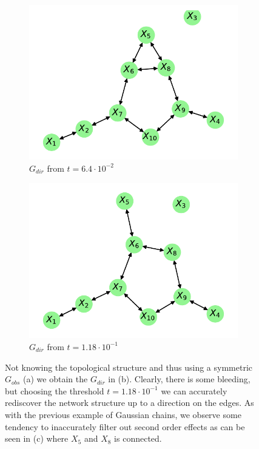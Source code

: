 \documentclass[../Thesis.tex]{subfiles}
\begin{document}
\begin{figure}[H]
\begin{subfigure}[t]{0.49\textwidth}
    \end{subfigure}
    \\[\baselineskip]
    \begin{subfigure}[t]{0.49\textwidth}
        \centering
        \includegraphics[width=.9\linewidth]{figures/Gaussian Network Theoretical/Graph from symmetric G obs - cor - cutoff 6_4e-2.pdf}
        \caption{$G_{dir}$  from $t = 6.4 \cdot 10^{-2}$}
    \end{subfigure}
    \hfill
    \begin{subfigure}[t]{0.49\textwidth}
        \centering
        \includegraphics[width=.9\linewidth]{figures/Gaussian Network Theoretical/Graph from symmetric G obs - cor - cutoff 1_18e-1.pdf}
        \caption{$G_{dir}$ from $t = 1.18 \cdot 10^{-1}$}
    \end{subfigure}
    \caption{Not knowing the topological structure and thus using a symmetric $G_{obs}$ (a) we obtain the $G_{dir}$ in (b). Clearly, there is some bleeding, but choosing the threshold $t = 1.18 \cdot 10^{-1}$ we can accurately rediscover the network structure up to a direction on the edges. As with the previous example of Gaussian chains, we observe some tendency to inaccurately filter out second order effects as can be seen in (c) where $X_5$ and $X_8$ is connected.}
    \label{fig:Gaussian network symmetric G_obs using correlation}
\end{figure}
\end{document}

